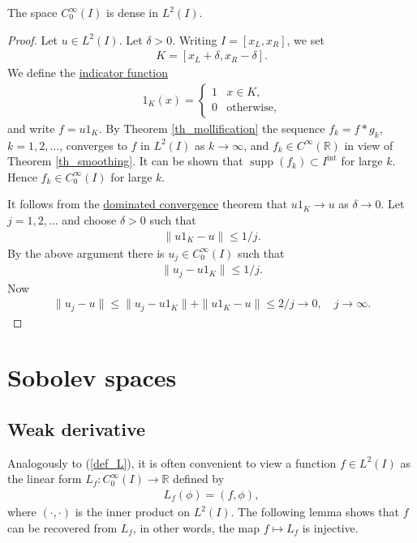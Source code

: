 \documentclass[12pt,oneside]{amsart}
\def\R{\mathbb R}
\DeclareMathOperator{\supp}{supp}
\def\inter{\mathrm{int}}
\begin{document}
\begin{corollary}[Density in $L^2$]\label{cor_density_L2}
The space $C_0^\infty(I)$ is dense in $L^2(I)$.
\end{corollary}
\begin{proof}
Let $u \in L^2(I)$.
Let $\delta > 0$. 
Writing $I = [x_L, x_R]$, we set 
    \begin{align*}
K = [x_L + \delta, x_R - \delta].
    \end{align*}
We define the \href{https://en.wikipedia.org/wiki/Indicator_function}{indicator function} 
    \begin{align*}
1_K(x) = 
\begin{cases}
1 & x \in K,
\\ 
0 & \text{otherwise},
\end{cases}
    \end{align*}
and write $f = u 1_K$.
By Theorem \ref{th_mollification} 
the sequence $f_k = f * g_k$, $k=1,2,\dots$,
converges to $f$ in $L^2(I)$ as $k \to \infty$,
and $f_k \in C^\infty(\R)$ in view of Theorem \ref{th_smoothing}.
It can be shown that $\supp(f_k) \subset I^\inter$ for large $k$. Hence $f_k \in C_0^\infty(I)$ for large $k$. 

It follows from the \href{https://en.wikipedia.org/wiki/Dominated_convergence_theorem}{dominated convergence} theorem
that $u1_K \to u$ as $\delta \to 0$.
Let $j = 1,2,\dots$ and choose $\delta > 0$ such that 
    \begin{align*}
\|u1_K - u\| \le 1/j.
    \end{align*} 
By the above argument there is $u_j \in C_0^\infty(I)$
such that 
    \begin{align*}
\|u_j - u1_K\| \le 1/j.
    \end{align*}
Now 
    \begin{align*}
\|u_j - u\| \le \|u_j - u1_K\| + \|u1_K - u\| \le 2/j \to 0,
\quad j \to \infty.
    \end{align*}
\end{proof}

\section{Sobolev spaces}

\subsection{Weak derivative}

Analogously to (\ref{def_L}), it is often convenient to view a function $f \in L^2(I)$ 
as the linear form $L_f : C_0^\infty(I) \to \R$ defined by 
    \begin{align*}
L_f(\phi) = (f, \phi),
    \end{align*}
where $(\cdot,\cdot)$ is the inner product on $L^2(I)$.
The following lemma shows that $f$ can be recovered from $L_f$, in other words, the map $f \mapsto L_f$ is injective. 
\end{document}
